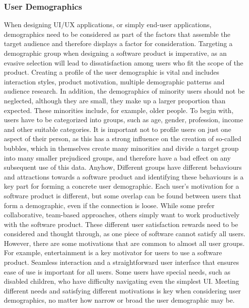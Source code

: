 \subsubsection{User Demographics}
When designing UI/UX applications, or simply end-user applications, demographics need to be considered as part of the factors that assemble the target audience and therefore displays a factor for consideration. Targeting a demographic group when designing a software product is imperative, as an evasive selection will lead to dissatisfaction among users who fit the scope of the product. Creating a profile of the user demographic is vital and includes interaction styles, product motivation, multiple demographic patterns and audience research. In addition, the demographics of minority users should not be neglected, although they are small, they make up a larger proportion than expected. These minorities include, for example, older people. 
\newline \noindent To begin with, users have to be categorized into groups, such as age, gender, profession, income and other suitable categories. It is important not to profile users on just one aspect of their person, as this has a strong influence on the creation of so-called bubbles, which in themselves create many minorities and divide a target group into many smaller prejudiced groups, and therefore have a bad effect on any subsequent use of this data. Anyhow, Different groups have different behaviours and attractions towards a software product and identifying these behaviours is a key part for forming a concrete user demographic.
\newline \noindent Each user's motivation for a software product is different, but some overlap can be found between users that form a demographic, even if the connection is loose. While some prefer collaborative, team-based approaches, others simply want to work productively with the software product. These different user satisfaction rewards need to be considered and thought through, as one piece of software cannot satisfy all users. However, there are some motivations that are common to almost all user groups. For example, entertainment is a key motivator for users to use a software product. Seamless interaction and a straightforward user interface that ensures ease of use is important for all users. Some users have special needs, such as disabled children, who have difficulty navigating even the simplest UI. Meeting different needs and satisfying different motivations is key when considering user demographics, no matter how narrow or broad the user demographic may be. 
